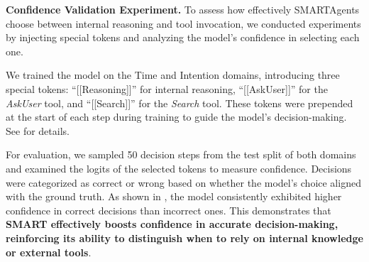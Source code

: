
\vspace{1.5mm}
\noindent\textbf{Confidence Validation Experiment.}
To assess how effectively SMARTAgents choose between internal reasoning and tool invocation, we conducted experiments by injecting special tokens and analyzing the model’s confidence in selecting each one.

We trained the model on the Time and Intention domains, introducing three special tokens: ``[[Reasoning]]'' for internal reasoning, ``[[AskUser]]'' for the \textit{AskUser} tool, and ``[[Search]]'' for the \textit{Search} tool. These tokens were prepended at the start of each step during training to guide the model's decision-making. See  for details.

For evaluation, we sampled 50 decision steps from the test split of both domains and examined the logits of the selected tokens to measure confidence. Decisions were categorized as correct or wrong based on whether the model's choice aligned with the ground truth. As shown in , the model consistently exhibited higher confidence in correct decisions than incorrect ones. This demonstrates that \textbf{SMART effectively boosts confidence in accurate decision-making, reinforcing its ability to distinguish when to rely on internal knowledge or external tools}.

